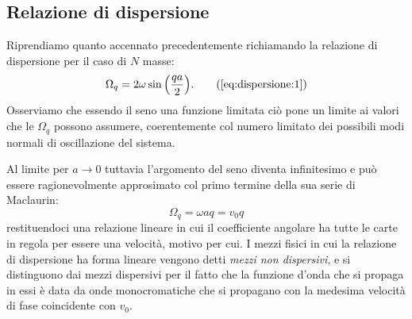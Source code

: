     \subsection{Relazione di dispersione}
        Riprendiamo quanto accennato precedentemente richiamando la relazione di dispersione per il caso di $N$ masse:
        \begin{equation}
            \Omega_q=2\omega\sin\qty(\frac{qa}{2}).
            \tag{\ref{eq:dispersione:1}}
        \end{equation}
        Osserviamo che essendo il seno una funzione limitata ci\`o pone un limite ai valori che le $\Omega_q$ possono assumere, coerentemente col numero limitato dei possibili modi normali di oscillazione del sistema.
        \par Al limite per $a\to 0$ tuttavia l'argomento del seno diventa infinitesimo e pu\`o essere ragionevolmente approsimato col primo termine della sua serie di Maclaurin:
            $$\Omega_q=\omega aq=v_0q$$
        restituendoci una relazione lineare in cui il coefficiente angolare ha tutte le carte in regola per essere una velocit\`a, motivo per cui. I mezzi fisici in cui la relazione di dispersione ha forma lineare vengono detti \emph{mezzi non dispersivi}, e si distinguono dai mezzi dispersivi per il fatto che la funzione d'onda che si propaga in essi \`e data da onde monocromatiche che si propagano con la medesima velocit\`a di fase coincidente con $v_0$.
